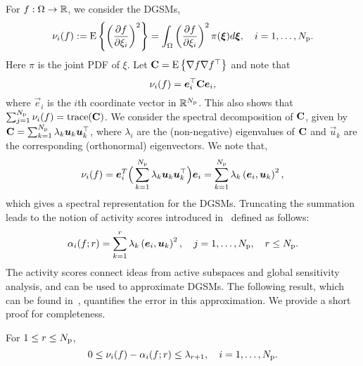For $f: \Omega \to \mathbb{R}$, we consider the DGSMs,
\[
    \nu_i(f) := \E{\left(\frac{\partial f}{\partial\xi_i}\right)^2} =
                  \int_\Omega 
                  \left(\frac{\partial f}{\partial\xi_i}\right)^2
                  \pi(\vec{\xi})d\vec{\xi}, \quad i = 1, \ldots, \Np.   
\]
Here $\pi$ is the joint PDF of $\xi$. 
Let $\mathbf{{C}} = \mathrm{E}\left\{{\nabla f \nabla f^\top} \right\}$ and note that
\[
   \nu_i(f) = \vec{e}_i^\top \mat{C} \vec{e}_i, 
\]
where $\vec{e}_i$ is the $i$th coordinate vector in $\mathbb{R}^{N_\text{p}}$.
This also shows that $\sum_{j=1}^{N_\text{p}} \nu_i(f) = \mathrm{trace}(\mathbf{{C}})$.
We consider the spectral decomposition of $\mathbf{{C}}$, given by  
$\mat{C} = \sum_{k=1}^\Np \lambda_k \vec{u}_k \vec{u}_k^\top$, where 
$\lambda_i$ are the (non-negative) eigenvalues of $\mathbf{{C}}$ and
$\vec{u}_k$ are the corresponding (orthonormal) eigenvectors.
We note that,
\begin{equation}\label{equ:spectral_DGSM}
\nu_i(f) = \vec{e}_i^T \Big(\sum_{k=1}^\Np \lambda_k \vec{u}_k \vec{u}_k^\top\Big) \vec{e}_i
 = \sum_{k=1}^\Np \lambda_k \ip{\vec{e}_i}{\vec{u}_k}^2, 
\end{equation}
which gives a spectral representation for the DGSMs. Truncating the summation 
leads to the notion of activity scores introduced in~\cite{Diaz:2016,Constantine:2017}
defined as follows: 
\[
   \alpha_i(f; r) =  \sum_{k=1}^r \lambda_k \ip{\vec{e}_i}{\vec{u}_k}^2,
   \quad j = 1, \ldots, \Np, \quad r \leq \Np.
\]
The activity scores connect ideas from active subspaces and global sensitivity
analysis, and can be used to approximate DGSMs.  The following result, which
can be found in~\cite{Diaz:2016,Constantine:2017}, quantifies the error in this
approximation. We provide a short proof for completeness. 
\begin{proposition}\label{prp:dgsm_bound} 
For $1 \leq r \leq {N_\text{p}}$,
\[
0 \leq \nu_i(f) - \alpha_i(f; r) \leq \lambda_{r+1}, \quad i = 1, \ldots, {N_\text{p}}.
\] 
\end{proposition}
